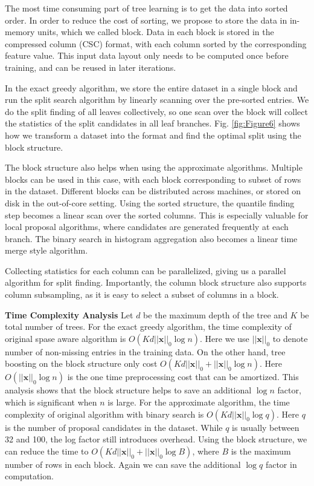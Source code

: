 \documentclass[sigconf]{acmart}
\begin{document}
The most time consuming part of tree learning is to get the data into sorted order. In order to reduce the cost of
sorting, we propose to store the data in in-memory units, which we called block. Data in each block is stored in the
compressed column (CSC) format, with each column sorted by the corresponding feature value. This input data layout
only needs to be computed once before training, and can be reused in later iterations.

In the exact greedy algorithm, we store the entire dataset in a single block and run the split search algorithm by 
linearly scanning over the pre-sorted entries. We do the split finding of all leaves collectively, so one scan over the block
will collect the statistics of the split candidates in all leaf branches. Fig. \ref{fig:Figure6} shows how we transform a dataset into the
format and find the optimal split using the block structure. 

The block structure also helps when using the approximate  algorithms. Multiple blocks can be used in this case, with each
block corresponding to subset of rows in the dataset. Different blocks can be distributed across machines, or stored on 
disk in the out-of-core setting. Using the sorted structure, the quantile finding step becomes a linear scan
over the sorted columns. This is especially valuable for local proposal algorithms, where candidates are generated 
frequently at each branch. The binary search in histogram aggregation also becomes a linear time merge style algorithm.

Collecting statistics for each column can be parallelized, giving us a parallel algorithm for split finding. Importantly,
the column block structure also supports column subsampling, as it is easy to select a subset of columns in a block.

\textbf{Time Complexity Analysis} Let $d$ be the maximum depth of the tree and $K$ be total number of trees. For the exact 
greedy algorithm, the time complexity of original spase aware algorithm is $O(Kd||\textbf{x}||_0 \log n)$. Here we use 
$||\textbf{x}||_0$ to denote number of non-missing entries in the training data. On the other hand, tree boosting on the
block structure only cost $O(Kd||\textbf{x}||_0 + ||\textbf{x}||_0 \log n)$. Here $O(||\textbf{x}||_0 \log n)$ is the
one time preprocessing cost that can be amortized. This analysis shows that the block structure helps to save an additional 
$\log n$ factor, which is significant when $n$ is large. For the approximate algorithm, the time complexity of original
algorithm with binary search is $O(Kd||\textbf{x}||_0 \log q)$. Here $q$ is the number of proposal candidates in the 
dataset. While $q$ is usually between 32 and 100, the log factor still introduces overhead. Using the block structure, 
we can reduce the time to $O(Kd||\textbf{x}||_0 + ||\textbf{x}||_0 \log B)$, where $B$ is the maximum number of rows in 
each block. Again we can save the additional $\log q$ factor in computation.
\end{document}
